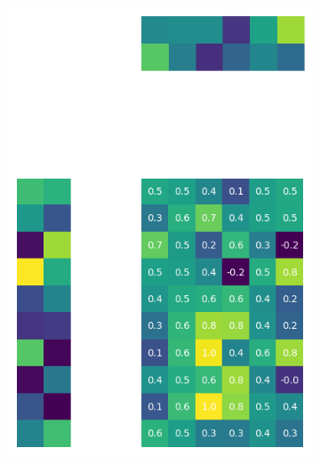 \documentclass[10pt,twocolumn]{article}
\begin{document}
\begin{figure}[H]
\begin{subfigure}[t]{.15\textwidth}
\centering
\includegraphics[scale=.2]{DWGs/random-matrix-reconstruction-PCs-2.png}
\caption{ }
\end{subfigure}
\begin{subfigure}[t]{.15\textwidth}
\centering

\end{subfigure}
\end{figure}
\end{document}
